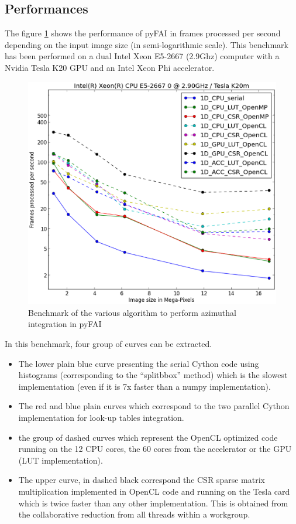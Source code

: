 \documentclass[preprint]{iucr}
\begin{document}
\subsection{Performances}
The figure \ref{benchmark} shows the performance of pyFAI in frames processed per
second depending on the input image size (in semi-logarithmic scale). 
This benchmark has been performed on a dual Intel Xeon E5-2667 (2.9Ghz) computer
with a Nvidia Tesla K20 GPU and an Intel Xeon Phi accelerator.

\begin{figure}
\label{benchmark}
\begin{center}
\includegraphics[width=15cm]{benchmark.eps}
\caption{Benchmark of the various algorithm to perform azimuthal integration in
pyFAI}
\end{center}
\end{figure}

In this benchmark, four group of curves can be extracted.
\begin{itemize}
  \item The lower plain blue curve presenting the serial Cython code using
  histograms (corresponding to the ``splitbbox'' method) which is the slowest
  implementation (even if it is 7x faster than a numpy implementation).
  \item The red and blue plain curves which correspond to the two parallel
  Cython implementation for look-up tables integration.
  \item the group of dashed curves which represent the OpenCL optimized code
  running on the 12 CPU cores, the 60 cores from the accelerator or the GPU (LUT
  implementation).
  \item The upper curve, in dashed black correspond the CSR sparse matrix
  multiplication implemented in OpenCL code and running on the Tesla card which
  is twice faster than any other implementation. This is obtained from the
  collaborative reduction from all threads within a workgroup.
\end{itemize}  
\end{document}
